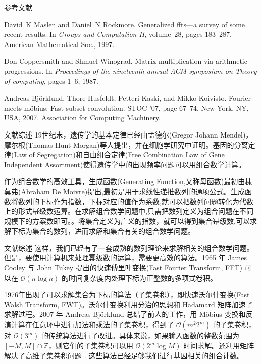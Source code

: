 \documentclass{beamer}
\begin{document}
	\begin{frame}{参考文献}
		\begin{thebibliography}{3}
			David~K Maslen and Daniel~N Rockmore.
			\newblock Generalized ffts—a survey of some recent results.
			\newblock In {\em Groups and Computation II}, volume~28, pages 183--287.
			American Mathematical Soc., 1997.
			
			Don Coppersmith and Shmuel Winograd.
			\newblock Matrix multiplication via arithmetic progressions.
			\newblock In {\em Proceedings of the nineteenth annual ACM symposium on Theory
				of computing}, pages 1--6, 1987.
			
			Andreas Bj\"{o}rklund, Thore Husfeldt, Petteri Kaski, and Mikko Koivisto.
			\newblock Fourier meets m\"{o}bius: Fast subset convolution.
			\newblock STOC '07, page 67–74, New York, NY, USA, 2007. Association for
			Computing Machinery.
		\end{thebibliography}
	\end{frame}

	\begin{frame}{文献综述}
		19世纪末，遗传学的基本定律已经由孟德尔(Gregor Johann Mendel)，摩尔根(Thomas Hunt Morgan)等人提出，并在细胞学研究中证明。基因的分离定律(Law of Segregation)和自由组合定律(Free Combination Law of Gene Independent Assortment)使得遗传学中的出现频率问题可以用组合数学计算。\cite{2009陈阅增普通生物学}
		
		作为组合数学的高效工具，生成函数(Generating Function,又称母函数)最初由棣莫弗(Abraham De Moivre)提出,最初是用于求线性递推数列的通项公式。\cite{knuth2005art}生成函数将数列的下标作为指数，下标对应的值作为系数,就可以把数列问题转化为代数上的形式幂级数运算。在求解组合数学问题中,只需把数列定义为组合问题在不同规模下的方案数即可。\cite{graham1989concrete}。将集合定义为广义的指数，就可以得到集合幂级数,可以求解下标为集合的数列，进而求解和集合有关的组合数学问题。
	\end{frame}

	\begin{frame}{文献综述}
		这样，我们已经有了一套成熟的数列理论来求解相关的组合数学问题。但是，要使用计算机来处理幂级数的运算，需要更高效的算法。1965 年 James Cooley 与 John Tukey 提出的快速傅里叶变换(Fast Fourier Transform, FFT)\cite{cooley1965algorithm} 可以在 $\mathcal{O}(n\log n)$ 的时间复杂度内处理下标为正整数的多项式卷积。
		
		1976年出现了可以求解集合为下标的算法（子集卷积），即快速沃尔什变换(Fast Walsh Transform, FWT)\cite{maslen1997generalized}。沃尔什变换利用分治的思想和 Hadamard 矩阵加速了求解过程\cite{coppersmith1987matrix}。2007 年 Andreas Björklund 总结了前人的工作，用 Möbius 变换和反演计算在任意环中进行加法和乘法的子集卷积，得到了 $\mathcal{O}(m^2 2^m)$ 的子集卷积，对 $\mathcal{O}(3^m)$ 的传统算法进行了改进。具体来说，如果输入函数的整数范围为 $[-M,M]\cap \mathbb{Z}$，则它们的子集卷积可以用 $\mathcal{O}(2^m\log M)$ 时间求解。还利用矩阵解决了高维子集卷积问题 \cite{10.1145/1250790.1250801}. 这些算法已经足够我们进行基因相关的组合计数。
	\end{frame}
\end{document}
